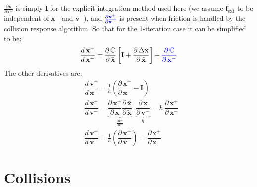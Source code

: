 \documentclass{article}
\newcommand{\der}[2]{\dfrac{d\, #1}{d\, #2}}
\newcommand{\pd}[2]{\dfrac{\partial\, #1}{\partial\, #2}}
\newcommand{\pdc}[2]{\frac{\partial #1}{\partial #2}}
\newcommand{\blue}[1]{\textcolor{blue}{#1}}
\begin{document}
$\pdc{\tilde{\mathbf{x}}}{\mathbf{x}^-}$ is simply $\mathbf{I}$ for the explicit integration method used here (we assume $\mathbf{f}_{\text{ext}}$ to be independent of $\mathbf{x}^-$ and $\mathbf{v}^-$), and $\blue{\pdc{\mathbf{x}^+}{\mathbf{x}^-}}$ is present when friction is handled by the collision response algorithm. So that for the 1-iteration case it can be simplified to be:
\begin{equation*}
    \der{\mathbf{x}^+}{\mathbf{x}^-} = 
        \pd{\mathbb{C}}{\bar{\mathbf{x}}}
        \left[\mathbf{I} + \pd{\Delta \mathbf{x}}{\tilde{\mathbf{x}}}\right] + 
        \blue{\pd{\mathbb{C}}{\mathbf{x}^-}}
\end{equation*}
The other derivatives are:
\begin{align}
& \der{\mathbf{v}^+}{\mathbf{x}^-} = 
    \frac{1}{h}\left(\pd{\mathbf{x}^+}{\mathbf{x}^-} - \mathbf{I}\right) \\[1ex]
& \der{\mathbf{x}^+}{\mathbf{v}^-} = 
    \underbrace{
        \pd{\mathbf{x}^+}{\bar{\mathbf{x}}}
        \pd{\bar{\mathbf{x}}}{\tilde{\mathbf{x}}}
    }_{\pdc{\mathbf{x}^+}{\mathbf{x}^-}}
    \;\;
    \underbrace{
        \pd{\tilde{\mathbf{x}}}{\mathbf{v}^-}
    }_{h} = 
    h\,\pd{\mathbf{x}^+}{\mathbf{x}^-} \\[1ex]
& \der{\mathbf{v}^+}{\mathbf{v}^-} = 
    \frac{1}{h}\left(\pd{\mathbf{x}^+}{\mathbf{v}^-}\right) = 
    \pd{\mathbf{x}^+}{\mathbf{x}^-}
\end{align}

\newpage

\section{Collisions}
\label{sec:collisions}
\end{document}
